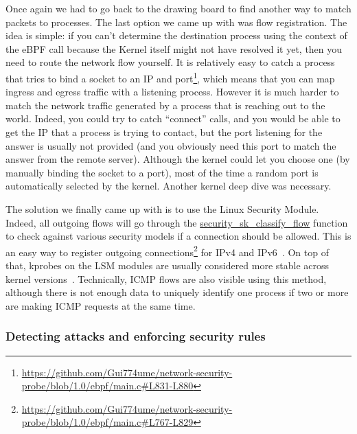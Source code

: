 Once again we had to go back to the drawing board to find another way to match packets to processes. The last option we came up with was flow registration. The idea is simple: if you can’t determine the destination process using the context of the eBPF call because the Kernel itself might not have resolved it yet, then you need to route the network flow yourself. It is relatively easy to catch a process that tries to bind a socket to an IP and port\footnote{\url{https://github.com/Gui774ume/network-security-probe/blob/1.0/ebpf/main.c#L831-L880}}, which means that you can map ingress and egress traffic with a listening process. However it is much harder to match the network traffic generated by a process that is reaching out to the world. Indeed, you could try to catch “connect” calls, and you would be able to get the IP that a process is trying to contact, but the port listening for the answer is usually not provided (and you obviously need this port to match the answer from the remote server). Although the kernel could let you choose one (by manually binding the socket to a port), most of the time a random port is automatically selected by the kernel. Another kernel deep dive was necessary.

The solution we finally came up with is to use the Linux Security Module. Indeed, all outgoing flows will go through the \url{security_sk_classify_flow} function to check against various security models if a connection should be allowed. This is an easy way to register outgoing connections\footnote{\url{https://github.com/Gui774ume/network-security-probe/blob/1.0/ebpf/main.c#L767-L829}} for IPv4 and IPv6~\cite{ProcessLevelNetworkSecurityMonitoring:RamiRosen}. On top of that, kprobes on the LSM modules are usually considered more stable across kernel versions~\cite{ProcessLevelNetworkSecurityMonitoring:BrendanGregg}. Technically, ICMP flows are also visible using this method, although there is not enough data to uniquely identify one process if two or more are making ICMP requests at the same time.

\subsubsection{Detecting attacks and enforcing security rules}

